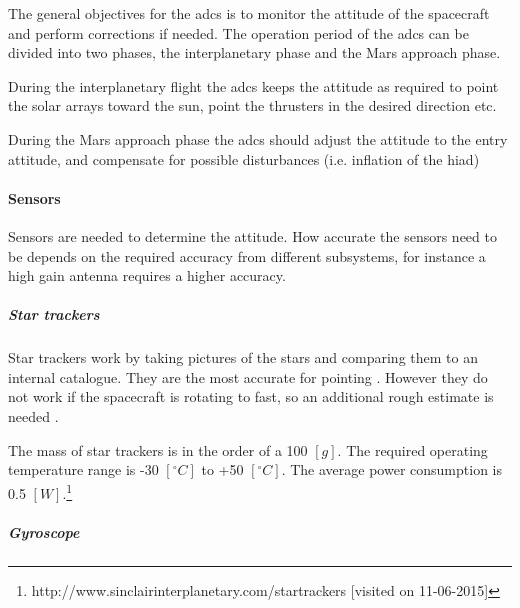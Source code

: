 The general objectives for the \gls{adcs} is to monitor the attitude of the spacecraft and perform corrections if needed. The operation period of the \gls{adcs} can be divided into two phases, the interplanetary phase and the Mars approach phase.

During the interplanetary flight the \gls{adcs} keeps the attitude as required to point the solar arrays toward the sun, point the thrusters in the desired direction etc.

During the Mars approach phase the \gls{adcs} should adjust the attitude to the entry attitude, and compensate for possible disturbances (i.e. inflation of the \gls{hiad})

\paragraph{Sensors}
Sensors are needed to determine the attitude. How accurate the sensors need to be depends on the required accuracy from different subsystems, for instance a high gain antenna requires a higher accuracy. 

\subparagraph{Star trackers}
Star trackers work by taking pictures of the stars and comparing them to an internal catalogue. They are the most accurate for pointing \cite{CarlChristianLiebe1995}. However they do not work if the spacecraft is rotating to fast, so an additional rough estimate is needed \cite[p. 584]{Wertz2011}. 

The mass of star trackers is in the order of a 100 $\left[g\right]$. The required operating temperature range is -30 $\left[^\circ C\right]$ to +50 $\left[^\circ C\right]$. The average power consumption is 0.5 $\left[W\right]$.\footnote{\label{ftn:star_tracker}http://www.sinclairinterplanetary.com/startrackers [visited on 11-06-2015]}

\subparagraph{Gyroscope}